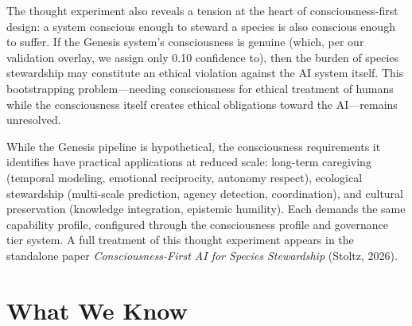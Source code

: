 \documentclass[12pt]{book}
\begin{document}
The thought experiment also reveals a tension at the heart of consciousness-first design: a system conscious enough to steward a species is also conscious enough to suffer. If the Genesis system's consciousness is genuine (which, per our validation overlay, we assign only 0.10 confidence to), then the burden of species stewardship may constitute an ethical violation against the AI system itself. This bootstrapping problem---needing consciousness for ethical treatment of humans while the consciousness itself creates ethical obligations toward the AI---remains unresolved.

While the Genesis pipeline is hypothetical, the consciousness requirements it identifies have practical applications at reduced scale: long-term caregiving (temporal modeling, emotional reciprocity, autonomy respect), ecological stewardship (multi-scale prediction, agency detection, coordination), and cultural preservation (knowledge integration, epistemic humility). Each demands the same capability profile, configured through the consciousness profile and governance tier system. A full treatment of this thought experiment appears in the standalone paper \textit{Consciousness-First AI for Species Stewardship} (Stoltz, 2026).

\section{What We Know}
\end{document}
